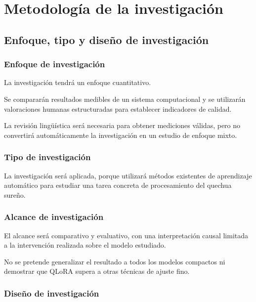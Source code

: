 \chapter{Metodología de la investigación}\label{metodologuxeda}

\section{Enfoque, tipo y diseño de investigación}\label{enfoque-tipo-diseno-investigacion}

\subsection{Enfoque de investigación}\label{enfoque-de-investigaciuxf3n}

La investigación tendrá un enfoque cuantitativo.

Se compararán resultados medibles de un sistema computacional y se utilizarán valoraciones humanas estructuradas para establecer indicadores de calidad.

La revisión lingüística será necesaria para obtener mediciones válidas, pero no convertirá automáticamente la investigación en un estudio de enfoque mixto.

\subsection{Tipo de investigación}\label{tipo-de-investigaciuxf3n}

La investigación será aplicada, porque utilizará métodos existentes de aprendizaje automático para estudiar una tarea concreta de procesamiento del quechua sureño.

\subsection{Alcance de investigación}\label{alcance-de-investigaciuxf3n}

El alcance será comparativo y evaluativo, con una interpretación causal limitada a la intervención realizada sobre el modelo estudiado.

No se pretende generalizar el resultado a todos los modelos compactos ni demostrar que QLoRA supera a otras técnicas de ajuste fino.

\subsection{Diseño de investigación}\label{diseuxf1o-de-investigaciuxf3n}

